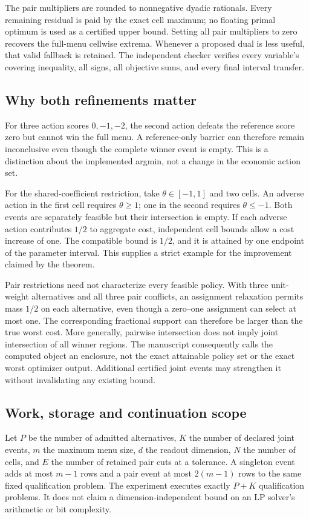 The pair multipliers are rounded to nonnegative dyadic rationals. Every remaining residual is paid by the exact cell maximum; no floating primal optimum is used as a certified upper bound. Setting all pair multipliers to zero recovers the full-menu cellwise extrema. Whenever a proposed dual is less useful, that valid fallback is retained. The independent checker verifies every variable's covering inequality, all signs, all objective sums, and every final interval transfer.

\subsection{Why both refinements matter}
For three action scores $0,-1,-2$, the second action defeats the reference score zero but cannot win the full menu. A reference-only barrier can therefore remain inconclusive even though the complete winner event is empty. This is a distinction about the implemented argmin, not a change in the economic action set.

For the shared-coefficient restriction, take $\theta\in[-1,1]$ and two cells. An adverse action in the first cell requires $\theta\ge1$; one in the second requires $\theta\le-1$. Both events are separately feasible but their intersection is empty. If each adverse action contributes $1/2$ to aggregate cost, independent cell bounds allow a cost increase of one. The compatible bound is $1/2$, and it is attained by one endpoint of the parameter interval. This supplies a strict example for the improvement claimed by the theorem.

Pair restrictions need not characterize every feasible policy. With three unit-weight alternatives and all three pair conflicts, an assignment relaxation permits mass $1/2$ on each alternative, even though a zero--one assignment can select at most one. The corresponding fractional support can therefore be larger than the true worst cost. More generally, pairwise intersection does not imply joint intersection of all winner regions. The manuscript consequently calls the computed object an enclosure, not the exact attainable policy set or the exact worst optimizer output. Additional certified joint events may strengthen it without invalidating any existing bound.

\subsection{Work, storage and continuation scope}
Let $P$ be the number of admitted alternatives, $K$ the number of declared joint events, $m$ the maximum menu size, $d$ the readout dimension, $N$ the number of cells, and $E$ the number of retained pair cuts at a tolerance. A singleton event adds at most $m-1$ rows and a pair event at most $2(m-1)$ rows to the same fixed qualification problem. The experiment executes exactly $P+K$ qualification problems. It does not claim a dimension-independent bound on an LP solver's arithmetic or bit complexity.

